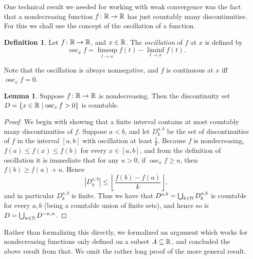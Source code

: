 \documentclass[leqno]{article}
\theoremstyle{definition}
\newtheorem{lemma}[theorem]{Lemma}
\newtheorem{definition}[theorem]{Definition}
\newcommand{\bldset}[2]{\{{#1}\mid{#2}\}}
\newcommand\osc{\mathop{\text{osc}}\nolimits}
\begin{document}
\medskip

One technical result we needed for working with weak convergence was the fact that a nondecreasing function $f\colon \mathbb{R} \rightarrow \mathbb{R}$ has just countably many discontinuities. For this we shall use the concept of the oscillation of a function. 

\begin{definition}
Let $f\colon \mathbb{R} \rightarrow \mathbb{R}$, and $x \in \mathbb{R}$. The {\em oscillation} of $f$ at $x$ is defined by
\[ \osc_x f = \limsup_{t \rightarrow x} f(t) - \liminf_{t \rightarrow x} f(t). \]
\end{definition}

Note that the oscillation is always nonnegative, and $f$ is continuous at $x$ iff $\osc_x f = 0$.

\begin{lemma}
Suppose $f\colon \mathbb{R} \rightarrow \mathbb{R}$ is nondecreasing. Then the discontinuity set $D = \bldset{x \in \R}{\osc_x f > 0}$ is countable.
\end{lemma}

\begin{proof}
We begin with showing that a finite interval contains at most countably many discontinuities of $f$. Suppose $a < b$, and let $D^{a,b}_k$ be the set of discontinuities of $f$ in the interval $[a,b]$ with oscillation at least $\frac{1}{k}$. Because $f$ is nondecreasing, $f(a) \le f(x) \le f(b)$ for every $x \in [a,b]$, and from the definition of oscillation it is immediate that for any $u > 0$, if $\osc_x f \ge u$, then $f(b) \ge f(a) + u$. Hence
\[ |D^{a,b}_k| \le \left\lfloor \frac{f(b) - f(a)}{k} \right\rfloor, \]
and in particular $D^{a,b}_k$ is finite. Thus we have that $D^{a,b} = \bigcup_{k \in \mathbb{N}} D^{a,b}_k$ is countable for every $a,b$ (being a countable union of finite sets), and hence so is \linebreak $D = \bigcup_{n \in \mathbb{N}} D^{-n,n}$.
\end{proof}

Rather than formalizing this directly, we formalized an argument which works for nondecreasing functions only defined on a subset $A \subseteq \mathbb{R}$, and concluded the above result from that. We omit the rather long proof of the more general result.

\medskip
\end{document}
